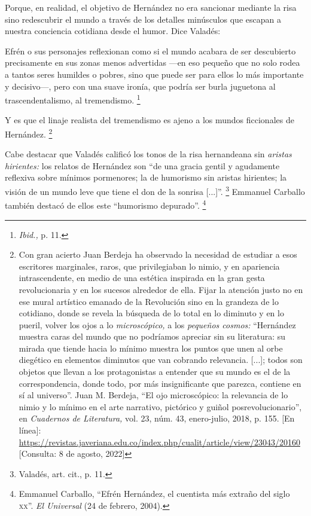 \documentclass[14pt,twoside,final]{extbook} %
\let\oldfootnote\footnote
\renewcommand\footnote[1]{%
\oldfootnote{\hspace{1mm}#1}}
\begin{document}
Porque, en realidad, el objetivo de Hernández no era sancionar mediante la risa sino redescubrir el mundo a través de los detalles minúsculos que escapan a nuestra conciencia cotidiana desde el humor. Dice Valadés: 
\begin{quoting}
Efrén o sus personajes reflexionan como si el mundo acabara de ser descubierto precisamente en sus zonas menos advertidas ---en eso pequeño que no solo rodea a tantos seres humildes o pobres, sino que puede ser para ellos lo más importante y decisivo---, pero con una suave ironía, que podría ser burla juguetona al trascendentalismo, al tremendismo.\footnote{\emph{Ibid.,} p. 11.}
\end{quoting}
Y es que el linaje realista del tremendismo es ajeno a los mundos ficcionales de Hernández.\footnote{Con gran acierto Juan Berdeja ha observado la necesidad de estudiar a esos escritores marginales, raros, que privilegiaban lo nimio, y en apariencia intrascendente, en medio de una estética inspirada en la gran gesta revolucionaria y en los sucesos alrededor de ella. Fijar la atención justo no en ese mural artístico emanado de la Revolución sino en la grandeza de lo cotidiano, donde se revela la búsqueda de lo total en lo diminuto y en lo pueril, volver los ojos a lo \emph{microscópico,} a los \emph{pequeños cosmos:} ``Hernández muestra caras del mundo que no podríamos apreciar sin su literatura: su mirada que tiende hacia lo mínimo muestra los puntos que unen al orbe diegético en elementos diminutos que van cobrando relevancia. [...]; todos son objetos que llevan a los protagonistas a entender que su mundo es el de la correspondencia, donde todo, por más insignificante que parezca, contiene en sí al universo''. Juan M. Berdeja, ``El ojo microscópico: la relevancia de lo nimio y lo mínimo en el arte narrativo, pictórico y guiñol posrevolucionario'', en \emph{Cuadernos de Literatura,} vol. 23, núm. 43, enero-julio, 2018, p. 155. [En línea]: \url{https://revistas.javeriana.edu.co/index.php/cualit/article/view/23043/20160} [Consulta: 8 de agosto, 2022]}

Cabe destacar que Valadés calificó los tonos de la risa hernandeana sin \emph{aristas hirientes:} los relatos de Hernández son ``de una gracia gentil y agudamente reflexiva sobre mínimos pormenores; la de humorismo sin aristas hirientes; la visión de un mundo leve que tiene el don de la sonrisa [...]''.\footnote{Valadés, art. cit., p. 11.} Emmanuel Carballo también destacó de ellos este ``humorismo depurado''.\footnote{Emmanuel Carballo, ``Efrén Hernández, el cuentista más extraño del siglo \textsc{xx}''. \emph{El Universal} (24 de febrero, 2004).}
\end{document}
